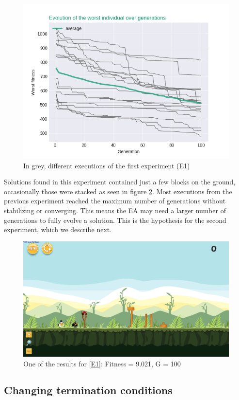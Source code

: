 \documentclass[sigconf]{acmart}
\begin{document}
\begin{figure}[H]
	\centering
	\includegraphics[scale=0.5]{exp1_worstIndv.png}
	\caption{In grey, different executions of the first experiment 
	(E1)}\label{f:grahp1}
\end{figure}
Solutions found in this experiment contained just a few blocks on the ground,
occasionally those were stacked as seen in figure \ref{f:e1}.
Most executions from the previous experiment reached the maximum number of 
generations without stabilizing or converging. This means the EA may need a 
larger number of generations to fully evolve a solution. This is the hypothesis 
for the second experiment, which we describe next.
\begin{figure}
	\centering
	\includegraphics[scale=0.2]{level-0-180523_203106.png}
	\caption{One of the results for \ref{E1}: Fitness = 9.021, G = 100  
	}\label{f:e1}
\end{figure}
\subsection{Changing termination conditions} \label{E2}
\end{document}
